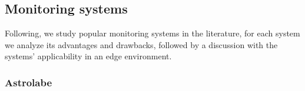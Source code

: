 





\subsection{Monitoring systems}

Following, we study popular monitoring systems in the literature, for each system we analyze its advantages and drawbacks, followed by a discussion with the systems' applicability in an edge environment.

\subsubsection{Astrolabe}

